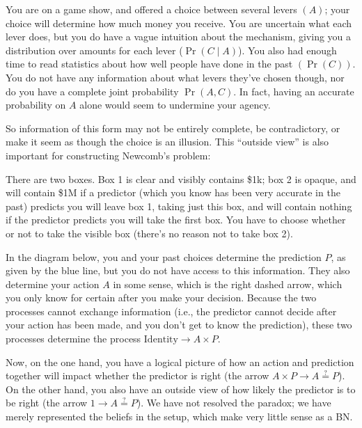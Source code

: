 \documentclass{article}
\begin{document}
	\begin{example}
		You are on a game show, and offered a choice between several levers $(A)$; your choice will determine how much money you receive. You are uncertain what each lever does, but you do have a vague intuition about the mechanism, giving you a distribution over amounts for each lever ($\Pr(C \mid A)$). You also had enough time to read statistics about how well people have done in the past $(\Pr(C))$. You do not have any information about what levers they've chosen though, nor do you have a complete joint probability $\Pr(A, C)$. In fact, having an accurate probability on $A$ alone would seem to undermine your agency.
	\end{example}


	So information of this form may not be entirely complete, be contradictory, or make it seem as though the choice is an illusion. This ``outside view'' is also important for constructing Newcomb's problem:
	
	\begin{example}[Newcomb]
		There are two boxes. Box 1 is clear and visibly contains \$1k; box 2 is opaque, and will contain \$1M if a predictor (which you know has been very accurate in the past) predicts you will leave box 1, taking just this box, and will contain nothing if the predictor predicts you will take the first box. You have to choose whether or not to take the visible box (there's no reason not to take box 2).
		
		In the diagram below, you and your past choices determine the prediction $P$, as given by the blue line, but you do not have access to this information. They also determine your action $A$ in some sense, which is the right dashed arrow, which you only know for certain after you make your decision. Because the two processes cannot exchange information (i.e., the predictor cannot decide after your action has been made, and you don't get to know the prediction), these two processes determine the process $\mathrm{Identity} \to A \times P$.
		\begin{center}
		\end{center}
		Now, on the one hand, you have a logical picture of how an action and prediction together will impact whether the predictor is right (the arrow $A \times P \to A \stackrel{?}{=} P$). On the other hand, you also have an outside view of how likely the predictor is to be right (the arrow $1 \to A \stackrel{?}{=} P$). We have not resolved the paradox; we have merely represented the beliefs in the setup, which make very little sense as a BN.
	\end{example}
\end{document}
